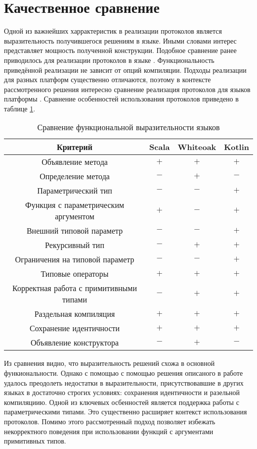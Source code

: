 \section{Качественное сравнение}
Одной из важнейших харрактеристик в реализации протоколов является выразительность получившегося решениям в языке. Иными словами интерес представляет мощность полученной конструкции. Подобное сравнение ранее приводилось для реализации протоколов в языке \cite{whiteoak}. Функциональность приведённой реализации не зависит от опций компиляции. Подходы реализации для разных платформ существенно отличаются, поэтому в контексте рассмотренного решения интересно сравнение реализация протоколов для языков платформы . Сравнение особенностей использования протоколов приведено в таблице \ref{features_comparison}.

\begin{table}[htb]
  \begin{center}
    \begin{tabular}{|c|c|c|c|} \hline
      Критерий & Scala & Whiteoak & Kotlin \\ \hline
      Объявление метода & $+$ & $+$ & $+$ \\ \hline
      Определение метода & $-$ & $+$ & $-$ \\ \hline
      Параметрический тип & $-$ & $-$ & $+$ \\ \hline
      Функция с параметрическим аргументом & $+$ & $-$ & $+$ \\ \hline
      Внешний типовой параметр & $-$ & $-$ & $+$ \\ \hline
      Рекурсивный тип & $-$ & $+$ & $+$ \\ \hline
      Ограничения на типовой параметр & $-$ & $-$ & $+$ \\ \hline
      Типовые операторы & $+$ & $+$ & $+$ \\ \hline
      Корректная работа с примитивными типами & $-$ & $+$ & $+$ \\ \hline
      Раздельная компиляция & $+$ & $+$ & $+$ \\ \hline
      Сохранение идентичности & $+$ & $+$ & $+$ \\ \hline
      Объявление конструктора & $-$ & $+$ & $-$ \\ \hline
    \end{tabular}
    \caption{Сравнение функциональной выразительности языков}
    \label{features_comparison}
  \end{center}
\end{table}

Из сравнения видно, что выразительность решений схожа в основной функиональности. Однако с помощью с помощью решения описаного в работе удалось преодолеть недостатки в выразительности, присутствовавшие в других языках в достаточно строгих условиях: сохранения идентичности и разельной компиляциию. Одной из ключевых осбенностей является поддержка работы с параметрическими типами. Это существенно расширяет контекст использования протоколов. Помимо этого рассмотренный подход позволяет избежать некорректного поведения при использовании функций с аргументами примитивных типов.
